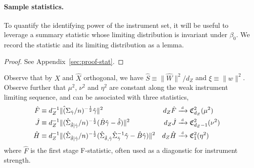 \paragraph*{Sample statistics.}
To quantify the identifying power of the instrument set, it will be useful to leverage a summary statistic whose limiting distribution is invariant under \(\beta_0\). We record the statistic and its limiting distribution as a lemma.

\begin{proof}
    See Appendix~\ref{sec:proof-stat}.
\end{proof}
\begin{remark}
Observe that by  \(X\) and \(\hat X\) orthogonal, we have \(\hat S \equiv \lVert \hat W\rVert^2/d_Z\) and \(\xi \equiv \lVert w \rVert^2\).
Observe further that \(\mu^2\), \(\nu^2\) and \(\eta^2\) are constant along the weak instrument limiting sequence, and can be associated with three statistics, 
\begin{align*}
    \hat F &\equiv d^{-1}_Z\lVert \hat (\Sigma_{\hat \gamma}/n)^{-\frac{1}{2}}\hat \gamma\rVert^2  & d_Z\hat F &\xrightarrow{{\scriptscriptstyle \mathrm{\;d\;}}} \mathfrak{C}^2_{d_Z}(\mu^2)\\ 
    \hat J &\equiv 
        d^{-1}_Z\lVert(\hat \Sigma_{\hat\delta \mid \hat\gamma}/n)^{-\frac{1}{2}}(\hat B \hat \gamma-\hat \delta)\rVert^2
        & d_Z\hat J &\xrightarrow{{\scriptscriptstyle \mathrm{\;d\;}}} \mathfrak{C}^2_{d_Z-1}(\nu^2)
        \\
        \hat H &\equiv 
        d^{-1}_Z\lVert(\hat \Sigma_{\hat\delta \mid \hat\gamma}/n)^{-\frac{1}{2}}(\hat \Sigma_{\hat \delta,\hat \gamma}\hat \Sigma_{\hat \gamma}^{-1} \hat \gamma-\hat B\hat \gamma)\rVert^2 
        & d_Z\hat H &\xrightarrow{{\scriptscriptstyle \mathrm{\;d\;}}} \mathfrak{C}^2_{1}(\eta^2)
\end{align*}
where \(\hat F\) is the first stage F-statistic, often used as a diagonstic for instrument strength.
\end{remark}



























    


